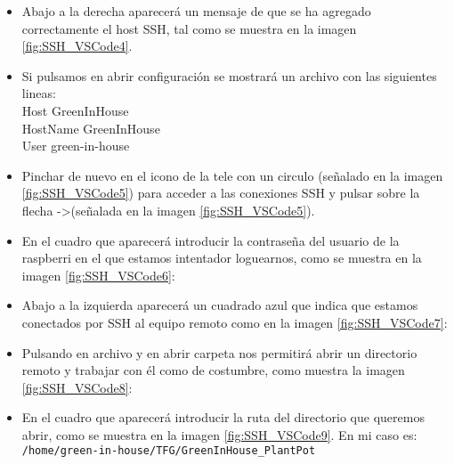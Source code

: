 \begin{itemize}
            \item Abajo a la derecha aparecerá un mensaje de que se ha agregado correctamente el host SSH, tal como se muestra en la imagen \ref{fig:SSH_VSCode4}.
            \\ 
            \item Si pulsamos en abrir configuración se mostrará un archivo con las siguientes lineas:
            \\ Host GreenInHouse
            \\ \hspace*{5mm}HostName GreenInHouse
            \\ \hspace*{5mm}User green-in-house
            \item Pinchar de nuevo en el icono de la tele con un circulo (señalado en la imagen \ref{fig:SSH_VSCode5}) para acceder a las conexiones SSH y pulsar sobre la flecha ->(señalada en la imagen \ref{fig:SSH_VSCode5}).
            \\ 
            \item En el cuadro que aparecerá introducir la contraseña del usuario de la raspberri en el que estamos intentador loguearnos, como se muestra en la imagen \ref{fig:SSH_VSCode6}:
            \\ 
            \item Abajo a la izquierda aparecerá un cuadrado azul que indica que estamos conectados por SSH al equipo remoto como en la imagen \ref{fig:SSH_VSCode7}:
            \\ 
            \item Pulsando en archivo y en abrir carpeta nos permitirá abrir un directorio remoto y trabajar con él como de costumbre, como muestra la imagen \ref{fig:SSH_VSCode8}:
            \\ 
            \item En el cuadro que aparecerá introducir la ruta del directorio que queremos abrir, como se muestra en la imagen \ref{fig:SSH_VSCode9}. En mi caso es:
            \\ \texttt{/home/green-in-house/TFG/GreenInHouse\_PlantPot}

\end{itemize}
